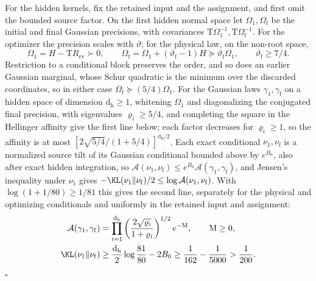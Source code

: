 For the hidden kernels, fix the retained input and the assignment, and first
omit the bounded source factor. On the first hidden normal space let
\(\Omega_1,\Omega_{\mathrm f}\) be the initial and final Gaussian precisions, with
covariances \(\mathrm T\Omega_1^{-1},\mathrm T\Omega_{\mathrm f}^{-1}\). For the
optimizer the precision scales with \(\vartheta\); for the physical law, on the
non-root space,
\begin{equation}
 \Omega_1=H-\mathrm TR_{\mathrm{ev}}\succ0,
 \qquad
 \Omega_{\mathrm f}=\Omega_1+(\vartheta_{\mathrm f}-1)H
       \succeq\vartheta_{\mathrm f}\Omega_1,
 \qquad \vartheta_{\mathrm f}\ge7/4.
 \label{eq:rg-formation-physical-precision-growth}
\end{equation}
Restriction to a conditional block preserves the order, and so does an earlier
Gaussian marginal, whose Schur quadratic is the minimum over the discarded
coordinates, so in either case \(\Omega_{\mathrm f}\succeq(5/4)\Omega_1\). For
the Gaussian laws
\(\gamma_1,\gamma_{\mathrm f}\) on a hidden space of dimension
\(\mathrm d_{\mathrm h}\ge1\), whitening \(\Omega_1\) and diagonalizing the
conjugated final precision, with eigenvalues \(\varrho_i\ge5/4\), and completing
the square in the Hellinger affinity give the first line below; each factor
decreases for \(\varrho_i\ge1\), so the affinity is at most
\([2\sqrt{5/4}/(1+5/4)]^{\mathrm d_{\mathrm h}/2}\). Each exact conditional
\(\nu_1,\nu_{\mathrm f}\) is a normalized source tilt of its Gaussian
conditional bounded above by \(e^{B_0}\), also after exact hidden integration,
so \(\mathcal A(\nu_1,\nu_{\mathrm f})\le e^{B_0}\mathcal A(\gamma_1,\gamma_{\mathrm f})\),
and Jensen's inequality under \(\nu_1\) gives
\(-\KL(\nu_1\Vert\nu_{\mathrm f})/2\le\log\mathcal A(\nu_1,\nu_{\mathrm f})\).
With \(\log(1+1/80)\ge1/81\) this gives the second line, separately for the
physical and optimizing conditionals and uniformly in the retained input and
assignment:
\begin{align}
 \mathcal A(\gamma_1,\gamma_{\mathrm f})
 &=\prod_{i=1}^{\mathrm d_{\mathrm h}}
       \left(\frac{2\sqrt{\varrho_i}}{1+\varrho_i}\right)^{1/2}
       e^{-\mathrm M},
 \qquad \mathrm M\ge0,
 \label{eq:rg-formation-gaussian-affinity}\\
 \KL(\nu_1\Vert\nu_{\mathrm f})
 &\ge\frac{\mathrm d_{\mathrm h}}{2}\log\frac{81}{80}-2B_0
 \ge\frac1{162}-\frac1{5000}>\frac1{200}.
 \label{eq:rg-formation-hidden-kernel-change}
\end{align}
\hfill\(\square\)

